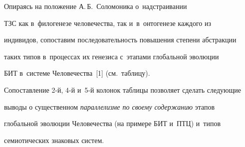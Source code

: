 \vspace*{-3pt}


  


  Опираясь на положение А.\,Б.~Соломоника о~надстраивании 


ТЗС как в~филогенезе человечества, так и~в~онтогенезе каждого из 


индивидов, сопоставим последовательность повышения степени абстракции 


таких типов в~процессах их генезиса с~этапами глобальной эволюции 


БИТ в~сис\-те\-ме Человечества~[1] (см.\ таб\-ли\-цу).











  Сопоставление 2-й, 4-й и~5-й колонок таблицы позволяет сделать сле\-ду\-ющие 


выводы о существенном \textit{параллелизме по своему содержанию} этапов 


глобальной эволюции Человечества (на примере БИТ и~ПТЦ) и~типов 


семиотических знаковых сис\-тем.


